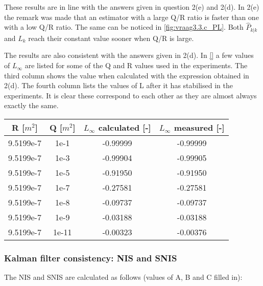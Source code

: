 \documentclass[a4paper]{article}
\newcommand{\newpar}{\vspace{.3cm}\noindent}
\begin{document}
\newpar
These results are in line with the answers given in question 2(e) and 2(d). In 2(e) the remark was made that an estimator with a large Q/R ratio is faster than one with a low Q/R ratio. The same can be noticed in \autoref{fig:vraag3.3.c_PL}. Both \(\hat{P}_{k|k}\) and \(L_{k}\) reach their constant value sooner when Q/R is large. 

\newpar
The results are also consistent with the answers given in 2(d).
In \autoref{} a few values of \(L_\infty\) are listed for some of the Q and R values used in the experiments. The third column shows the value when calculated with the expression obtained in 2(d). The fourth column lists the values of L after it has stabilised in the experiments. It is clear these correspond to each other as they are almost always exactly the same.

\begin{center}
    \begin{tabular}{ |c|c|c|c|}
    \hline
    R [\(m^2\)] & Q [\(m^2\)] & \(L_\infty\) calculated [-] & \(L_\infty\) measured [-]  \\
    \hline
    9.5199e-7        & 1e-1     & -0.99999      &   -0.99999           \\
    \hline
    9.5199e-7        & 1e-3     & -0.99904      &  -0.99905                 \\
    \hline
    9.5199e-7        & 1e-5     & -0.91950      &  -0.91950            \\
    \hline
    9.5199e-7        & 1e-7     & -0.27581      & -0.27581           \\ 
    \hline
    9.5199e-7        & 1e-8     & -0.09737      & -0.09737           \\ 
    \hline
    9.5199e-7        & 1e-9     & -0.03188      & -0.03188           \\ 
    \hline
    9.5199e-7        & 1e-11    & -0.00323      & -0.00376           \\ 
    \hline
    \end{tabular}  
    \label{tab:location_Sys_31z_f}
\end{center}


\subsubsection{Kalman filter consistency: NIS and SNIS}

The NIS and SNIS are calculated as follows (values of A, B and C filled in):
\end{document}
